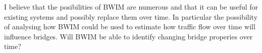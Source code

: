 I believe that the posibilities of BWIM are numerous and that it can be useful for existing systems and possibly replace them over time. In particular the possibility of analysing how BWIM could be used to estimate how traffic flow over time will influence bridges. Will BWIM be able to identify changing bridge properies over time?
